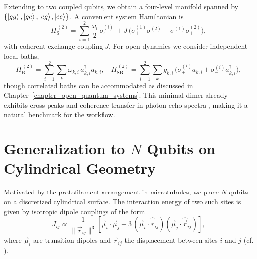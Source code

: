 Extending to two coupled qubits, we obtain a four-level manifold spanned by $\{\ket{gg},\ket{ge},\ket{eg},\ket{ee}\}$. A convenient system Hamiltonian is
\begin{equation}
	H_{\mathrm{S}}^{\,(2)} = \sum_{i=1}^{2} \frac{\omega_i}{2}\, \sigma_z^{(i)}
	\,+ J\,\bigl( \sigma_{+}^{(1)}\sigma_{-}^{(2)} + \sigma_{-}^{(1)}\sigma_{+}^{(2)} \bigr),
	\label{eq:two_qubit_system}
\end{equation}
with coherent exchange coupling $J$. For open dynamics we consider independent local baths,
\begin{equation}
	H_{\mathrm{B}}^{\,(2)} = \sum_{i=1}^{2} \sum_{k} \omega_{k,i}\, a_{k,i}^{\dagger} a_{k,i},
	\quad
	H_{\mathrm{SB}}^{\,(2)} = \sum_{i=1}^{2} \sum_{k} g_{k,i}\,\bigl( \sigma_{+}^{(i)} a_{k,i} + \sigma_{-}^{(i)} a_{k,i}^{\dagger} \bigr),
	\label{eq:two_qubit_bath}
\end{equation}
though correlated baths can be accommodated as discussed in Chapter~\ref{chapter_open_quantum_systems}. This minimal dimer already exhibits cross-peaks and coherence transfer in photon-echo spectra \cite{pisliakovetal2006twodimensionalopticalthreepulse}, making it a natural benchmark for the workflow.


\section{Generalization to \texorpdfstring{$N$}{N} Qubits on Cylindrical Geometry}

Motivated by the protofilament arrangement in microtubules, we place $N$ qubits on a discretized cylindrical surface. The interaction energy of two such sites is given by isotropic dipole couplings of the form \cite{griffiths2013introductionelectrodynamics}
\begin{equation}
	J_{ij} \propto \frac{1}{ \lVert \vec{r}_{ij} \rVert^{3} }
	\left[
		\vec{\mu}_i \cdot \vec{\mu}_j - 3\,(\vec{\mu}_i \cdot \hat{\vec{r}}_{ij})(\vec{\mu}_j \cdot \hat{\vec{r}}_{ij})
		\right],
	\label{eq:dipole_dipole}
\end{equation}
where $\vec{\mu}_i$ are transition dipoles and $\vec{r}_{ij}$ the displacement between sites $i$ and $j$ (cf. \cite{lehmberg1970radiationatomsystem,masters2014pathsforstersresonance}).

